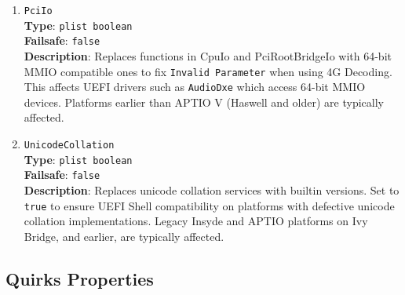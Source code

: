 \documentclass[]{article}
\begin{document}
\begin{enumerate}
\item
  \texttt{PciIo}\\
  \textbf{Type}: \texttt{plist\ boolean}\\
  \textbf{Failsafe}: \texttt{false}\\
  \textbf{Description}: Replaces functions in CpuIo and PciRootBridgeIo with
  64-bit MMIO compatible ones to fix \texttt{Invalid Parameter} when using 4G Decoding.
  This affects UEFI drivers such as \texttt{AudioDxe} which access 64-bit MMIO devices.
  Platforms earlier than APTIO V (Haswell and older) are typically affected.

\item
  \texttt{UnicodeCollation}\\
  \textbf{Type}: \texttt{plist\ boolean}\\
  \textbf{Failsafe}: \texttt{false}\\
  \textbf{Description}: Replaces unicode collation services with builtin
  versions. Set to \texttt{true} to ensure UEFI Shell compatibility on platforms
  with defective unicode collation implementations. Legacy Insyde and APTIO platforms
  on Ivy Bridge, and earlier, are typically affected.

\end{enumerate}

\subsection{Quirks Properties}\label{uefiquirkprops}
\end{document}
